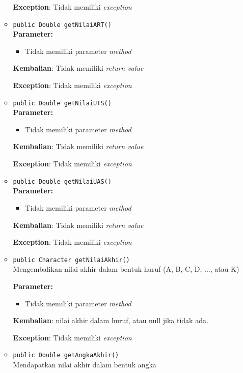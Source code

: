 \documentclass{article}
\begin{document}
\begin{enumerate}
\begin{itemize}
\textbf{Exception}: Tidak memiliki \textit{exception}

\item \texttt{public Double getNilaiART()}\\ 


\textbf{Parameter:}\begin{itemize}
\item Tidak memiliki parameter \textit{method}
\end{itemize}
\textbf{Kembalian}: Tidak memiliki \textit{return value}

\textbf{Exception}: Tidak memiliki \textit{exception}

\item \texttt{public Double getNilaiUTS()}\\ 


\textbf{Parameter:}\begin{itemize}
\item Tidak memiliki parameter \textit{method}
\end{itemize}
\textbf{Kembalian}: Tidak memiliki \textit{return value}

\textbf{Exception}: Tidak memiliki \textit{exception}

\item \texttt{public Double getNilaiUAS()}\\ 


\textbf{Parameter:}\begin{itemize}
\item Tidak memiliki parameter \textit{method}
\end{itemize}
\textbf{Kembalian}: Tidak memiliki \textit{return value}

\textbf{Exception}: Tidak memiliki \textit{exception}

\item \texttt{public Character getNilaiAkhir()}\\ 
Mengembalikan nilai akhir dalam bentuk huruf (A, B, C, D, ..., atau K)

\textbf{Parameter:}\begin{itemize}
\item Tidak memiliki parameter \textit{method}
\end{itemize}
\textbf{Kembalian}: nilai akhir dalam huruf, atau null jika tidak ada.

\textbf{Exception}: Tidak memiliki \textit{exception}

\item \texttt{public Double getAngkaAkhir()}\\ 
Mendapatkan nilai akhir dalam bentuk angka


\end{itemize}
\end{enumerate}
\end{document}
